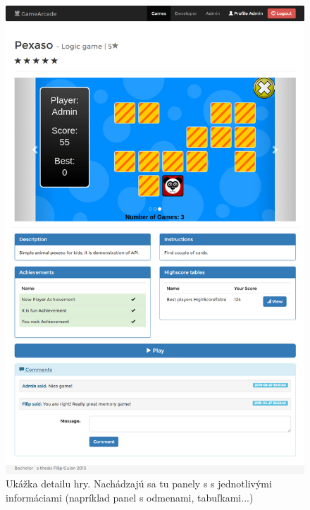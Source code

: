 \begin{figure}[h]
  \centering
  \includegraphics[scale=0.35]{fig/ukazka-detail-hra.png}
  \caption{Ukážka detailu hry. Nachádzajú sa tu panely s s jednotlivými informáciami (napríklad panel s odmenami, tabuľkami...)}
  \label{fig:ukazka-detailhry}
\end{figure}

